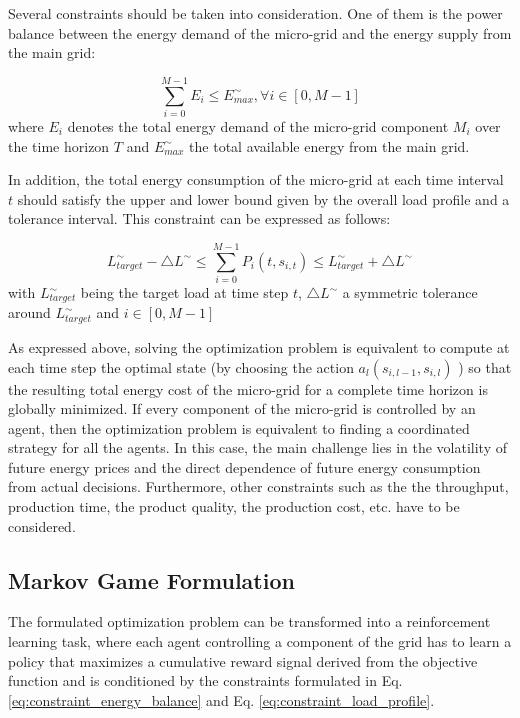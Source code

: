 Several constraints should be taken into consideration. One of them is the power balance between the energy demand of the micro-grid and the energy supply from the main grid:

\begin{equation}
\label{eq:constraint_energy_balance}	
	\sum_{i=0}^{M-1}{ E_i} \leq E_{max}^\sim,  \forall i \in [0, M-1]
\end{equation}
where $E_i$ denotes the total energy demand of the micro-grid component $M_i$ over the time horizon $T$ and $E_{max}^\sim$ the total available energy from the main grid.

In addition, the total energy consumption of the micro-grid at each time interval $t$ should satisfy the upper and lower bound given by the overall load profile and a tolerance interval. This constraint can be expressed as follows:

\begin{equation}
\label{eq:constraint_load_profile}	
	L_{target}^\sim - \triangle L^\sim \leq {\sum_{i=0}^{M-1}{ P_i (t, s_{i,t})} } \leq L_{target}^\sim + \triangle L^\sim
\end{equation} 
with $L_{target}^\sim$  being the target load at time step $t$, $\triangle L^\sim$  a symmetric tolerance around $L_{target}^\sim$ and $ i \in [0, M-1]$

As expressed above, solving the optimization problem is equivalent to compute at each time step the optimal state (by choosing the action $a_l (s_{i,l-1},s_{i,l})$ ) so that the resulting total energy cost of the micro-grid for a complete time horizon is globally minimized. If every component of the micro-grid is controlled by an agent, then the optimization problem is equivalent to finding a coordinated strategy for all the agents. In this case, the main challenge lies in the volatility of future energy prices and the direct dependence of future energy consumption from actual decisions. Furthermore, other constraints such as the the throughput, production time, the product quality, the production cost, etc. have to be considered.

\subsection{Markov Game Formulation}
The formulated optimization problem can be transformed into a reinforcement learning task, where each agent controlling a component of the grid has to learn a policy that maximizes a cumulative reward signal derived from the objective function and is conditioned by the constraints formulated in Eq. \ref{eq:constraint_energy_balance} and Eq. \ref{eq:constraint_load_profile}.

